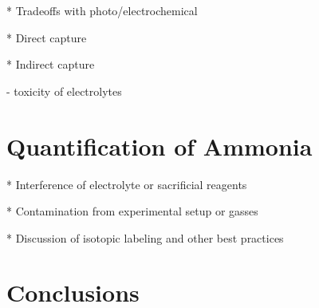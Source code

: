 * Tradeoffs with photo/electrochemical

* Direct capture

* Indirect capture

   - toxicity of electrolytes


\section{Quantification of Ammonia}
* Interference of electrolyte or sacrificial reagents

* Contamination from experimental setup or gasses

* Discussion of isotopic labeling and other best practices

\section{Conclusions}


